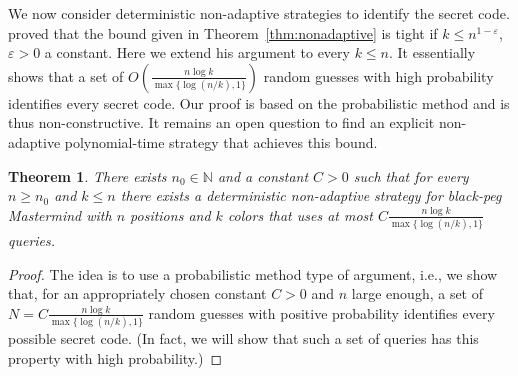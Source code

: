\documentclass[english,a4paper,11pt]{article}
\newcommand{\comment}[1]{{\bf [#1]}}
\newcommand{\CW}[1]{\comment{\textcolor{blue}{CW: #1}}}
\newtheorem{theorem}{Theorem}
\newcommand{\ifLongCites}[2]{#1}
\newcommand{\ifLongCites}[2]{#2}
\begin{document}
{%

We now consider deterministic non-adaptive strategies to identify the secret code. \ifLongCites{\cite{Chvatal83}}{Chv\'atal~\cite{Chvatal83}} proved that the bound given in Theorem~\ref{thm:nonadaptive} is tight if $k \leq n^{1-\varepsilon}$, $\varepsilon>0$ a constant. 
Here we extend his argument to every $k \le n$. It essentially shows that a set of $O(\frac{n \log k}{\max \{ \log(n/k), 1\}})$ random guesses with high probability identifies every secret code. Our proof is based on the probabilistic method and is thus non-constructive. It remains an open question to find an explicit non-adaptive polynomial-time strategy that achieves this bound.

\begin{theorem} \label{thm:non-adaptive-lb}
There exists $n_0 \in \mathbb N$ and a constant $C > 0$ such that for every $n \ge n_0$ and $k \le n$ there exists a deterministic non-adaptive strategy for black-peg Mastermind with $n$ positions and $k$ colors that uses at most $C \frac{n \log k}{\max \{ \log(n/k), 1 \}}$ queries.
\end{theorem}


\begin{proof}
The idea is to use a probabilistic method type of argument, i.e., we show that, for an appropriately chosen constant $C > 0$ and $n$ large enough, a set of $N = C \frac{n \log k}{\max \{ \log(n/k), 1 \}}$ random guesses with positive probability identifies every possible secret code. (In fact, we will show that such a set of queries has this property with high probability.)


\end{proof}}
\end{document}
